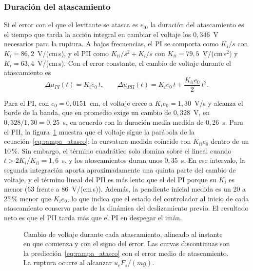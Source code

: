 \subsubsection{Duración del atascamiento}

Si el error con el que el levitante se atasca es $e_0$, la duración del atascamiento es el tiempo que tarda la acción integral en cambiar el voltaje los $0{,}346$~V necesarios para la ruptura. A bajas frecuencias, el PI se comporta como $K_i/s$ con $K_i=86{,}2$~V/(cm\,s), y el PII como $K_{ii}/s^2 + K_i/s$ con $K_{ii}=79{,}5$~V/(cm\,s$^2$) y $K_i=63{,}4$~V/(cm\,s). Con el error constante, el cambio de voltaje durante el atascamiento es
\begin{equation}
\Delta u_{PI}(t) = K_i e_0\, t, \qquad
\Delta u_{PII}(t) = K_i e_0\, t + \frac{K_{ii} e_0}{2}\, t^2 .
\label{eq:rampa_atasco}
\end{equation}

Para el PI, con $e_0=0{,}0151$~cm, el voltaje crece a $K_i e_0 = 1{,}30$~V/s y alcanza el borde de la banda, que en promedio exige un cambio de $0{,}328$~V, en $0{,}328/1{,}30=0{,}25$~s, en acuerdo con la duración media medida de $0{,}26$~s. Para el PII, la figura~\ref{fig:atasco} muestra que el voltaje sigue la parábola de la ecuación~\eqref{eq:rampa_atasco}: la curvatura medida coincide con $K_{ii}e_0$ dentro de un 10\,\%. Sin embargo, el término cuadrático solo domina sobre el lineal cuando $t > 2K_i/K_{ii} = 1{,}6$~s, y los atascamientos duran unos $0{,}35$~s. En ese intervalo, la segunda integración aporta aproximadamente una quinta parte del cambio de voltaje, y el término lineal del PII es más lento que el del PI porque su $K_i$ es menor (63 frente a 86~V/(cm\,s)). Además, la pendiente inicial medida es un 20 a 25\,\% menor que $K_i e_0$, lo que indica que el estado del controlador al inicio de cada atascamiento conserva parte de la dinámica del deslizamiento previo. El resultado neto es que el PII tarda más que el PI en despegar el imán.

\begin{figure}[ht]
    \centering
    
    \caption[Voltaje durante el atascamiento]{Cambio de voltaje durante cada atascamiento, alineado al instante en que comienza y con el signo del error. Las curvas discontinuas son la predicción~\eqref{eq:rampa_atasco} con el error medio de atascamiento. La ruptura ocurre al alcanzar $u_eF_s/(mg)$.}
    \label{fig:atasco}
\end{figure}

